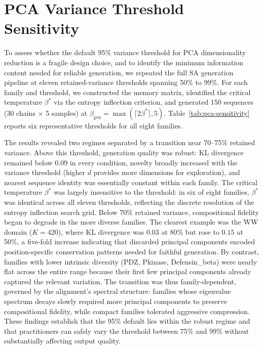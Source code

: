 \section{PCA Variance Threshold Sensitivity}\label{si:pca-sensitivity}

To assess whether the default 95\% variance threshold for PCA dimensionality reduction is a fragile design choice, and to identify the minimum information content needed for reliable generation, we repeated the full SA generation pipeline at eleven retained-variance thresholds spanning 50\% to 99\%. For each family and threshold, we constructed the memory matrix, identified the critical temperature $\beta^*$ via the entropy inflection criterion, and generated 150 sequences (30 chains $\times$ 5 samples) at $\beta_{\mathrm{gen}} = \max(\lceil 2\beta^* \rceil, 5)$. Table~\ref{tab:pca-sensitivity} reports six representative thresholds for all eight families.

The results revealed two regimes separated by a transition near 70--75\% retained variance. Above this threshold, generation quality was robust: KL divergence remained below 0.09 in every condition, novelty broadly increased with the variance threshold (higher $d$ provides more dimensions for exploration), and nearest sequence identity was essentially constant within each family. The critical temperature $\beta^*$ was largely insensitive to the threshold: in six of eight families, $\beta^*$ was identical across all eleven thresholds, reflecting the discrete resolution of the entropy inflection search grid. Below 70\% retained variance, compositional fidelity began to degrade in the more diverse families. The clearest example was the WW domain ($K{=}420$), where KL divergence was $0.03$ at 80\% but rose to $0.15$ at 50\%, a five-fold increase indicating that discarded principal components encoded position-specific conservation patterns needed for faithful generation. By contrast, families with lower intrinsic diversity (PDZ, Pkinase, Defensin\_beta) were nearly flat across the entire range because their first few principal components already captured the relevant variation. The transition was thus family-dependent, governed by the alignment's spectral structure: families whose eigenvalue spectrum decays slowly required more principal components to preserve compositional fidelity, while compact families tolerated aggressive compression. These findings establish that the 95\% default lies within the robust regime and that practitioners can safely vary the threshold between 75\% and 99\% without substantially affecting output quality.


